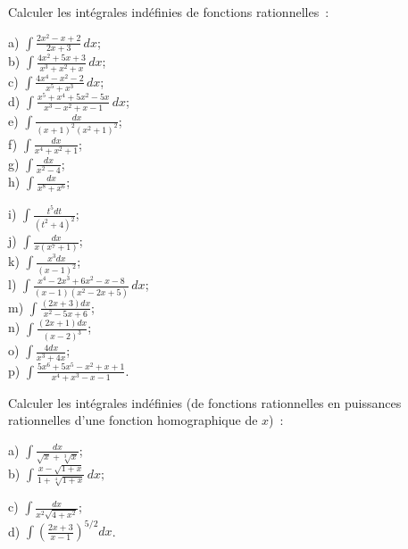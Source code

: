 \documentclass[12pt,french,oneside,a4paper]{memoir} %
\begin{document}
\begin{exo}
Calculer les intégrales indéfinies de fonctions
rationnelles~:\\

\hfill
\begin{minipage}[t]{6cm}
a) $\displaystyle{\int \frac{2x^2-x+2}{2x+3}\,dx}$;\\[2mm]
b) $\displaystyle{\int\frac{4x^2+5x+3}{x^3+x^2+x}\,dx}$;\\[2mm]
c) $\displaystyle{\int \frac{4x^4-x^2-2}{x^5+x^3}\,dx}$;\\[2mm]
d) $\displaystyle{\int
\frac{x^5+x^4+5x^2-5x}{x^3-x^2+x-1}\,dx}$;\\[2mm] 
e) $\displaystyle{\int \frac{dx}{(x+1)^2(x^2+1)^2}}$;\\[2mm] 
f) $\displaystyle{\int \frac{dx}{x^4+x^2+1}}$;\\[2mm] 
g) $\displaystyle{\int \frac{dx}{x^2-4}}$;\\[2mm] 
h) $\displaystyle{\int \frac{dx}{x^8+x^6}}$;
\end{minipage} \hfill
\begin{minipage}[t]{6cm}
i) $\displaystyle{\int \frac{t^5dt}{(t^2+4)^2}}$;\\[2mm]
j) $\displaystyle{\int \frac{dx}{x(x^7+1)}}$;\\[2mm]
k) $\displaystyle{\int \frac{x^3dx}{(x-1)^2}}$;\\[2mm]
l) $\displaystyle{\int
\frac{x^4-2x^3+6x^2-x-8}{(x-1)(x^2-2x+5)}\,dx}$;\\[2mm] 
m) $\displaystyle{\int \frac{(2x+3)dx}{x^2-5x+6}}$;\\[2mm]
n) $\displaystyle{\int \frac{(2x+1)dx}{(x-2)^3}}$;\\[2mm]
o) $\displaystyle{\int \frac{4dx}{x^3+4x}}$;\\[2mm]
p) $\displaystyle{\int
\frac{5x^6+5x^5-x^2+x+1}{x^4+x^3-x-1}}$. \end{minipage} \hfill
\end{exo}
\begin{exo}
Calculer les intégrales indéfinies (de fonctions
rationnelles en puissances rationnelles d'une fonction
homographique de $x$)~:\\

\hfill 
\begin{minipage}[t]{6cm}
a) $\displaystyle{\int\frac{dx}{\sqrt x+\sqrt[3]x}}$;\\[2mm]
b) $\displaystyle{\int
\frac{x-\sqrt{1+x}}{1+\sqrt[4]{1+x}}\,dx};$
\end{minipage}\hfill
\begin{minipage}[t]{8cm}
c) $\displaystyle{\int
\frac{dx}{x^2\sqrt{4+x^2}}};$\\[2mm] 
d) $\displaystyle{\int(\frac{2x+3}{x-1})^{5/2}dx}$.
\end{minipage} \hfill
\end{exo}
\end{document}
